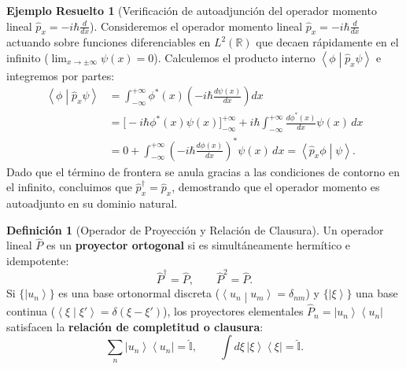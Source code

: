 \documentclass[11pt,a4paper,twoside]{report}
\theoremstyle{definition}
\newtheorem{definicion}{Definición}[chapter]
\newtheorem{ejemplo}{Ejemplo Resuelto}[chapter]
\theoremstyle{plain}
\theoremstyle{remark}
\newcommand{\ket}[1]{\left| #1 \right\rangle}
\newcommand{\braket}[2]{\left\langle #1 \middle| #2 \right\rangle}
\newcommand{\ketbra}[2]{\left| #1 \right\rangle\!\left\langle #2 \right|}
\newcommand{\op}[1]{\hat{#1}}
\newcommand{\ident}{\hat{\mathbb{I}}}
\begin{document}
\begin{ejemplo}[Verificación de autoadjunción del operador momento lineal $\op{p}_x = -i\hbar \frac{d}{dx}$]
Consideremos el operador momento lineal $\op{p}_x = -i\hbar \frac{d}{dx}$ actuando sobre funciones diferenciables en $L^2(\mathbb{R})$ que decaen rápidamente en el infinito ($\lim_{x\to\pm\infty} \psi(x) = 0$). Calculemos el producto interno $\braket{\phi}{\op{p}_x \psi}$ e integremos por partes:
\begin{align}
    \braket{\phi}{\op{p}_x \psi} &= \int_{-\infty}^{+\infty} \phi^*(x) \left( -i\hbar \frac{d\psi(x)}{dx} \right) dx \nonumber \\
    &= \Big[ -i\hbar \phi^*(x)\psi(x) \Big]_{-\infty}^{+\infty} + i\hbar \int_{-\infty}^{+\infty} \frac{d\phi^*(x)}{dx} \psi(x)\,dx \nonumber \\
    &= 0 + \int_{-\infty}^{+\infty} \left( -i\hbar \frac{d\phi(x)}{dx} \right)^* \psi(x)\,dx = \braket{\op{p}_x \phi}{\psi}.
\end{align}
Dado que el término de frontera se anula gracias a las condiciones de contorno en el infinito, concluimos que $\op{p}_x^\dagger = \op{p}_x$, demostrando que el operador momento es autoadjunto en su dominio natural.
\end{ejemplo}

\begin{definicion}[Operador de Proyección y Relación de Clausura]
Un operador lineal $\op{P}$ es un \textbf{proyector ortogonal} si es simultáneamente hermítico e idempotente:
\begin{equation}
    \op{P}^\dagger = \op{P}, \qquad \op{P}^2 = \op{P}.
\end{equation}
Si $\{\ket{u_n}\}$ es una base ortonormal discreta ($\braket{u_n}{u_m} = \delta_{nm}$) y $\{\ket{\xi}\}$ una base continua ($\braket{\xi}{\xi'} = \delta(\xi - \xi')$), los proyectores elementales $\op{P}_n = \ketbra{u_n}{u_n}$ satisfacen la \textbf{relación de completitud o clausura}:
\begin{equation}
    \sum_n \ketbra{u_n}{u_n} = \ident, \qquad \int d\xi\, \ketbra{\xi}{\xi} = \ident.
\end{equation}
\end{definicion}
\end{document}
